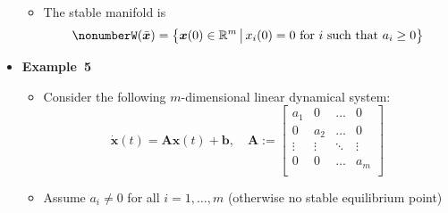 \documentclass[12pt,a4paper]{article}
\begin{document}
\begin{itemize}
\begin{itemize}
  \item The stable manifold is
    \begin{equation}\nonumber%
      W(\bar{\bm{x}}) =
      \left\{ \bm{x}(0) \in \R^{m}
        \,\big|\,
        \text{$x_{i}(0) = 0$ for $i$ such that $a_{i}\geq 0$}
      \right\}
    \end{equation}
  \end{itemize}

\item \textbf{Example~5}
  \begin{itemize}
  \item Consider the following $m$-dimensional linear dynamical system:
    \begin{equation}\nonumber%
      \dot{\bm{x}}(t)
      =
      \bm{A}
      \bm{x}(t) + \bm{b},
      \quad
      \bm{A}:=
      \begin{bmatrix}
        a_{1} & 0 & \ldots & 0 \\
        0 & a_{2} & \ldots & 0 \\
        \vdots & \vdots & \ddots & \vdots \\
        0 & 0 & \ldots & a_{m} \\
      \end{bmatrix}
    \end{equation}

  \item Assume $a_{i}\neq 0$ for all $i=1,\ldots, m$
    (otherwise no stable equilibrium point)


\end{itemize}
\end{itemize}
\end{document}
